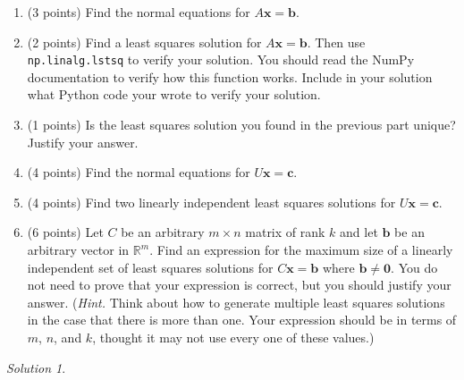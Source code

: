 \documentclass{article}
\theoremstyle{remark}
\newtheorem*{solution}{Solution}
\newcommand{\vv}[1]{\mathbf{#1}}
\newcommand{\R}{\mathbb R}
\begin{document}
\begin{enumerate}
\item (3 points) Find the normal equations for $A\vv x = \vv b$.
\item (2 points) Find a least squares solution for $A \vv x = \vv b$. Then use \texttt{np.linalg.lstsq} to verify your solution. You should read the NumPy documentation to verify how this function works. Include in your solution what Python code your wrote to verify your solution.
\item (1 points) Is the least squares solution you found in the previous part unique? Justify your answer.
\item (4 points) Find the normal equations for $U\vv x = \vv c$.
\item (4 points) Find two linearly independent least squares solutions for $U\vv x = \vv c$.
\item (6 points) Let $C$ be an arbitrary $m \times n$ matrix of rank $k$ and let $\mathbf b$ be an arbitrary vector in $\R^m$.
  Find an expression for the maximum size of a linearly independent set of least squares solutions for $C\mathbf x = \mathbf b$ where $\vv b \not = \vv 0$.
  You do not need to prove that your expression is correct, but you should justify your answer.
  (\textit{Hint.} Think about how to generate multiple least squares solutions in the case that there is more than one. Your expression should be in terms of $m$, $n$, and $k$, thought it may not use every one of these values.)
\end{enumerate}
\medskip

\begin{solution}
\end{solution}
\end{document}
